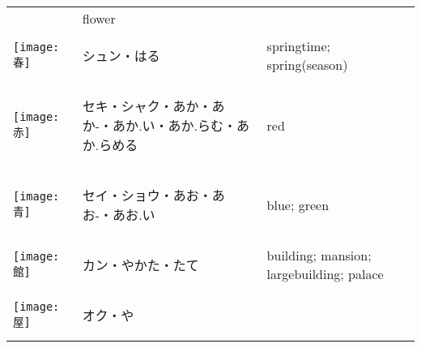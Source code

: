 \documentclass[a4paper,12pt]{extarticle}
\begin{document}
\begin{longtable}{|lp{6cm}p{4cm}|}
&
flower
\\ 
\begin{minipage}{0.3\textwidth}
\centerline{
	\texttt{[image: 春]}
}
\end{minipage}
&
\begin{CJK}{UTF8}{min}シュン・はる\end{CJK}
&
springtime; spring(season)
\\ 
\begin{minipage}{0.3\textwidth}
\centerline{
	\texttt{[image: 赤]}
}
\end{minipage}
&
\begin{CJK}{UTF8}{min}セキ・シャク・あか・あか-・あか.い・あか.らむ・あか.らめる\end{CJK}
&
red
\\ 
\begin{minipage}{0.3\textwidth}
\centerline{
	\texttt{[image: 青]}
}
\end{minipage}
&
\begin{CJK}{UTF8}{min}セイ・ショウ・あお・あお-・あお.い\end{CJK}
&
blue; green
\\ 
\begin{minipage}{0.3\textwidth}
\centerline{
	\texttt{[image: 館]}
}
\end{minipage}
&
\begin{CJK}{UTF8}{min}カン・やかた・たて\end{CJK}
&
building; mansion; largebuilding; palace
\\ 
\begin{minipage}{0.3\textwidth}
\centerline{
	\texttt{[image: 屋]}
}
\end{minipage}
&
\begin{CJK}{UTF8}{min}オク・や\end{CJK}

\end{longtable}
\end{document}
